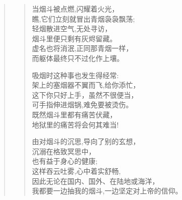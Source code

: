 \documentclass[openany,oneside]{book}
\begin{document}
\begin{quote}
\begin{verse}
        当烟斗被点燃,闪耀着火光，\\
        \hspace{1em}瞧,它们立刻就冒出青烟袅袅飘荡;\\
        \hspace{2em}轻烟散进空气,无处寻访，\\
        \hspace{1em}烟斗里便只剩有灰烬留藏。\\
        \hspace{2em}虚名也将消泯,正同那青烟一样，\\
        \hspace{2em}而躯体最终只不过化作上壤。\\
        \vspace{1em}
        
        吸烟时这种事也发生得经常:\\
        \hspace{1em}架上的塞烟器不翼而飞,给你添忙，\\
        \hspace{2em}这下你只好上手，虽然不很便当，\\
        \hspace{1em}可手指伸进烟锅,难免要被烫伤。\\
        \hspace{2em}既然烟斗里都有痛苦伏藏，\\
        \hspace{2em}地狱里的痛苦将会何其难当!\\
        \vspace{1em}
        
        由对烟斗的沉思,导向了别的玄想，\\
        \hspace{1em}沉溺在格致冥思中，\\
        \hspace{2em}也有益于身心的健康;\\
        \hspace{1em}这样吞云吐雾,心中着实舒畅,\\
        \hspace{2em}因此无论在国内、国外、在陆地或海洋，\\
        \hspace{2em}我都要一边抽我的烟斗,一边坚定对上帝的信仰。\\
    \end{verse}
\end{quote}
\end{document}
